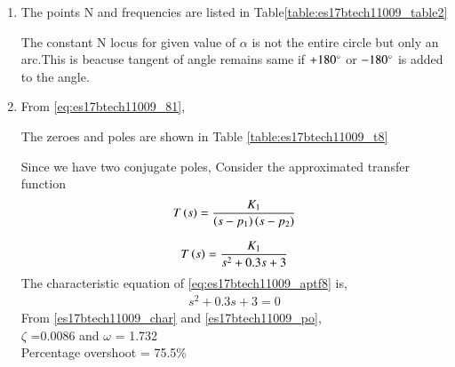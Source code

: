 \begin{enumerate}[label=\thesection.\arabic*.,ref=\thesection.\theenumi]
\begin{table}[!ht]
\label{table:es17btech11009_table1}
\end{table}
\item
The points N and frequencies are listed in Table\ref{table:es17btech11009_table2}
\begin{table}[!ht]
\centering

\caption{}
\label{table:es17btech11009_table2}
\end{table}
The constant N locus for given value of $\alpha$ is not the entire circle but only an arc.This is beacuse tangent of angle remains same if $+180\degree$ or 
$-180\degree$ is added to the angle.
\item
From \eqref{eq:es17btech11009_81},

The zeroes and poles are shown in Table \ref{table:es17btech11009_t8}

\begin{table}[!ht]
\centering

\caption{}
\label{table:es17btech11009_t8}
\end{table}
Since we have two conjugate poles, Consider the approximated transfer function 
\begin{align}
T\left(s\right) = \frac{K_1}{\left(s-p_{1}\right)\left(s-p_{2}\right)}
\end{align}

\begin{align}
    T\brak{s}= \frac{K_1}{s^2 + 0.3s + 3}
    \label{eq:es17btech11009_aptf8}
\end{align}
The characteristic equation of \eqref{eq:es17btech11009_aptf8} is,
\begin{align}
s^2 + 0.3s + 3=0
 \end{align}
From \eqref{es17btech11009_char} and \eqref{es17btech11009_po},
\\
 $\zeta$ =0.0086 and $\omega$ = 1.732
 \\
 Percentage overshoot = 75.5\%


\end{enumerate}

